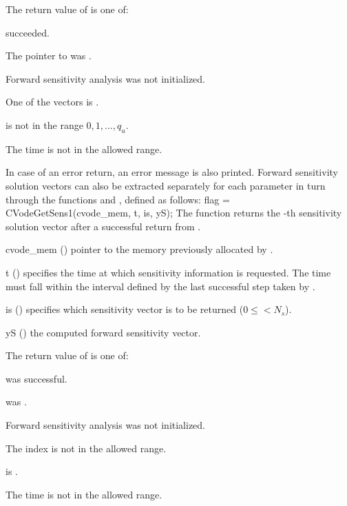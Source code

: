 {
  The return value  of  is one of:
  \begin{args}
  \item[\Id{CV\_SUCCESS}] 
     succeeded.
  \item[\Id{CV\_MEM\_NULL}] 
    The pointer to  was .
  \item[\Id{CV\_NO\_SENS}] 
    Forward sensitivity analysis was not initialized.
  \item[\Id{CV\_BAD\_DKY}] 
    One of the vectors  is .
  \item[\Id{CV\_BAD\_K}]
     is not in the range $0, 1, ..., q_u$.
  \item[\Id{CV\_BAD\_T}] 
    The time  is not in the allowed range.
  \end{args}
}
{
  In case of an error return, an error message is also printed.  
}
Forward sensitivity solution vectors can also be extracted separately for 
each parameter in turn through the functions  and
, defined as follows:
{
  flag = CVodeGetSens1(cvode\_mem, t, is, yS);
}
{
  The function  returns the -th sensitivity solution vector
  after a successful return from .
}
{
  \begin{args}
  \item[cvode\_mem] ()
    pointer to the memory previously allocated by .
  \item[t] ()
    specifies the time at which sensitivity information is 
    requested. The time  must fall within the interval defined by the last 
    successful step taken by {\cvodes}.
  \item[is] () specifies which sensitivity vector is to be returned
    ($0\le$$< N_s$).
  \item[yS] ()
    the computed forward sensitivity vector.
  \end{args}
}
{
  The return value  of  is one of:
  \begin{args}
  \item[\Id{CV\_SUCCESS}]
     was successful.
  \item[\Id{CV\_MEM\_NULL}] 
     was .
  \item[\Id{CV\_NO\_SENS}] 
    Forward sensitivity analysis was not initialized.
  \item[\Id{CV\_BAD\_IS}]
    The index  is not in the allowed range.
  \item[\Id{CV\_BAD\_DKY}] 
     is .
  \item[\Id{CV\_BAD\_T}] 
    The time  is not in the allowed range.
  \end{args}
}
